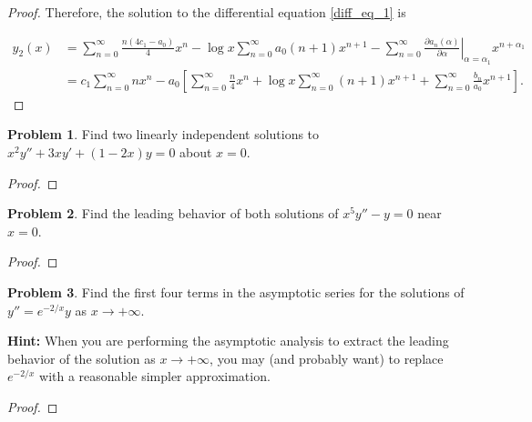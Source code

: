 \documentclass[12pt]{article}
\theoremstyle{definition}
\newtheorem{problem}{Problem}
\begin{document}
\begin{proof}
  Therefore, the solution to the differential equation \eqref{diff_eq_1} is

  \begin{align*}
    y_2(x) &= \sum_{n=0}^\infty\frac{n(4c_1-a_0)}{4}x^n - \log x \sum_{n=0}^\infty a_0(n+1)x^{n+1} - \sum_{n=0}^\infty\left.\frac{\partial a_n(\alpha)}{\partial \alpha}\right|_{\alpha=\alpha_1} x^{n+\alpha_1}\\
    &= c_1\sum_{n=0}^\infty n x^n - a_0 \left[\sum_{n=0}^\infty \frac{n}{4} x^n+ \log x \sum_{n=0}^\infty (n+1)x^{n+1} + \sum_{n=0}^\infty\frac{b_n}{a_0} x ^{n+1}\right].
  \end{align*}
\end{proof}
\newpage


\begin{problem}
  Find two linearly independent solutions to $x^2y'' + 3xy' + (1-2x)y = 0$ about $x=0$.
\end{problem}

\begin{proof}
\end{proof}
\newpage


\begin{problem}
  Find the leading behavior of both solutions of $x^5y'' - y = 0$ near $x=0$.
\end{problem}

\begin{proof}
\end{proof}
\newpage


\begin{problem}
  Find the first four terms in the asymptotic series for the solutions of $y'' = e^{-2/x}y$ as $x\to + \infty$.

  \textbf{Hint:} When you are performing the asymptotic analysis to extract the leading
  behavior of the solution as $x\to  + \infty$, you may (and probably want) to replace
  $e^{-2/x}$ with a reasonable simpler approximation.
\end{problem}

\begin{proof}
\end{proof}
\newpage
\end{document}
